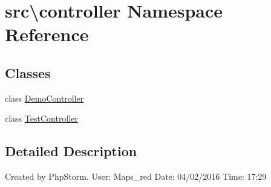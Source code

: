 \hypertarget{namespacesrc_1_1controller}{}\section{src\textbackslash{}controller Namespace Reference}
\label{namespacesrc_1_1controller}
\subsection*{Classes}
\begin{DoxyCompactItemize}
\item 
class \hyperlink{classsrc_1_1controller_1_1DemoController}{Demo\+Controller}
\item 
class \hyperlink{classsrc_1_1controller_1_1TestController}{Test\+Controller}
\end{DoxyCompactItemize}


\subsection{Detailed Description}
Created by Php\+Storm. User\+: Maps\+\_\+red Date\+: 04/02/2016 Time\+: 17\+:29 